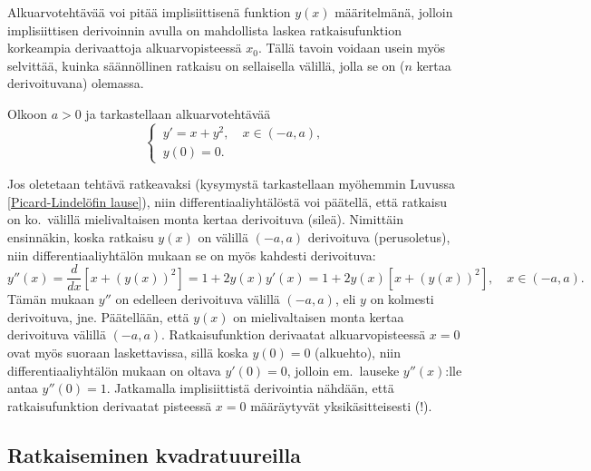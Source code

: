 Alkuarvotehtävää voi pitää implisiittisenä funktion $y(x)$ määritelmänä, jolloin implisiittisen
derivoinnin avulla on mahdollista laskea ratkaisufunktion korkeampia derivaattoja 
alkuarvopisteessä $x_0$. Tällä tavoin voidaan usein myös selvittää, kuinka säännöllinen ratkaisu
on sellaisella välillä, jolla se on ($n$ kertaa derivoituvana) olemassa.
\begin{Exa} \label{Airyn DY} Olkoon $a>0$ ja tarkastellaan alkuarvotehtävää
\[
\begin{cases} \,y'=x+y^2, \quad x\in(-a,a), \\ \,y(0)=0. \end{cases}
\]

Jos oletetaan tehtävä ratkeavaksi (kysymystä tarkastellaan myöhemmin Luvussa 
\ref{Picard-Lindelöfin lause}), niin differentiaaliyhtälöstä voi päätellä, että ratkaisu on 
ko.\ välillä mielivaltaisen monta kertaa derivoituva (sileä). Nimittäin ensinnäkin, koska
ratkaisu $y(x)$ on välillä $(-a,a)$ derivoituva (perusoletus), niin differentiaaliyhtälön
mukaan se on myös kahdesti derivoituva:
\[ 
y''(x) = \frac{d}{dx}[x+(y(x))^2] 
       = 1 + 2y(x)y'(x) = 1+2y(x)[x+(y(x))^2], \quad x \in (-a,a). 
\]
Tämän mukaan $y''$ on edelleen derivoituva välillä $(-a,a)$, eli $y$ on kolmesti derivoituva,
jne. Päätellään, että $y(x)$ on mielivaltaisen monta kertaa derivoituva välillä $(-a,a)$.
Ratkaisufunktion derivaatat alkuarvopisteessä $x=0$ ovat myös suoraan laskettavissa, sillä
koska $y(0)=0$ (alkuehto), niin differentiaaliyhtälön mukaan on oltava $y'(0)=0$, jolloin em.\
lauseke $y''(x)$:lle antaa $y''(0)=1$. Jatkamalla implisiittistä derivointia nähdään, että 
ratkaisufunktion \pain{kaikki} derivaatat pisteessä $x=0$ määräytyvät yksikäsitteisesti (!).
\loppu
\end{Exa}

\subsection*{Ratkaiseminen kvadratuureilla}

